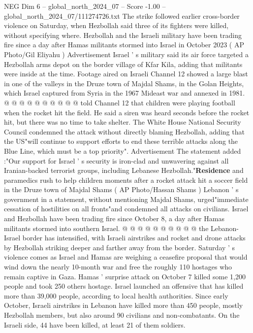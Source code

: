 \begin{textsample}{NEG Dim 6 – global\_north\_2024\_07 – Score -1.00 – global\_north\_2024\_07/111274726.txt}
The strike followed earlier cross-border violence on Saturday, when Hezbollah said three of its fighters were killed, without specifying where.
Hezbollah and the Israeli military have been trading fire since a day after Hamas militants stormed into Israel in October 2023 ( AP Photo/Gil Eliyahu ) Advertisement Israel ' s military said its air force targeted a Hezbollah arms depot on the border village of Kfar Kila, adding that militants were inside at the time.
Footage aired on Israeli Channel 12 showed a large blast in one of the valleys in the Druze town of Majdal Shams, in the Golan Heights, which Israel captured from Syria in the 1967 Mideast war and annexed in 1981. @ @ @ @ @ @ @ @ @ @ told Channel 12 that children were playing football when the rocket hit the field.
He said a siren was heard seconds before the rocket hit, but there was no time to take shelter.
The White House National Security Council condemned the attack without directly blaming Hezbollah, adding that the US"will continue to support efforts to end these terrible attacks along the Blue Line, which must be a top priority".
Advertisement The statement added :"Our support for Israel ' s security is iron-clad and unwavering against all Iranian-backed terrorist groups, including Lebanese Hezbollah."\textbf{Residence} and paramedics rush to help children moments after a rocket attack hit a soccer field in the Druze town of Majdal Shams ( AP Photo/Hassan Shams ) Lebanon ' s government in a statement, without mentioning Majdal Shams, urged"immediate cessation of hostilities on all fronts"and condemned all attacks on civilians.
Israel and Hezbollah have been trading fire since October 8, a day after Hamas militants stormed into southern Israel. @ @ @ @ @ @ @ @ @ @ the Lebanon-Israel border has intensified, with Israeli airstrikes and rocket and drone attacks by Hezbollah striking deeper and farther away from the border.
Saturday ' s violence comes as Israel and Hamas are weighing a ceasefire proposal that would wind down the nearly 10-month war and free the roughly 110 hostages who remain captive in Gaza.
Hamas ' surprise attack on October 7 killed some 1,200 people and took 250 others hostage.
Israel launched an offensive that has killed more than 39,000 people, according to local health authorities.
Since early October, Israeli airstrikes in Lebanon have killed more than 450 people, mostly Hezbollah members, but also around 90 civilians and non-combatants.
On the Israeli side, 44 have been killed, at least 21 of them soldiers.

\end{textsample}
